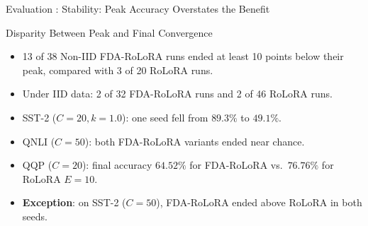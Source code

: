 \documentclass[aspectratio=169]{beamer}
\begin{document}
\begin{frame}{Evaluation : Stability: Peak Accuracy Overstates the Benefit}
    \vspace{-0.3em}
    \begin{block}{Disparity Between Peak and Final Convergence}
        \small
        \begin{itemize}
            \item 13 of 38 Non-IID FDA-RoLoRA runs ended at least 10 points below their peak, compared with 3 of 20 RoLoRA runs.
            \item Under IID data: 2 of 32 FDA-RoLoRA runs and 2 of 46 RoLoRA runs.
            \item SST-2 ($C = 20, k = 1.0$): one seed fell from $89.3\%$ to $49.1\%$.
            \item QNLI ($C = 50$): both FDA-RoLoRA variants ended near chance.
            \item QQP ($C = 20$): final accuracy $64.52\%$ for FDA-RoLoRA vs.\ $76.76\%$ for RoLoRA $E = 10$.
            \item \textbf{Exception}: on SST-2 ($C = 50$), FDA-RoLoRA ended above RoLoRA in both seeds.
        \end{itemize}
    \end{block}
\end{frame}
\end{document}
